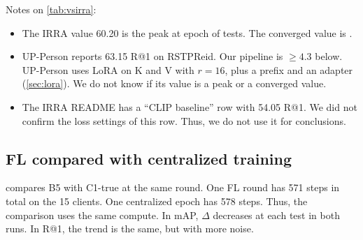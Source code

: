\begin{table}[t]
\centering\small
\caption{Comparison on the same measure. ``Peak'': maximum of all tests. ``Converged'': mean $\pm$ standard deviation of the last tests (IRRA: epochs 51--60; C1-true: epochs 15--20). $^{a}$Log in \texttt{data/irra\_rtsp} with \texttt{loss\_names: sdm+id+mlm}. Its timestamp is 2023-03-17, so it is probably the log that the IRRA authors released. We did not confirm the source. $^{b}$One seed. $^{c}$One test at round 30. The run stopped at round \numBoneLast.}\label{tab:vsirra}
\fit{}
\end{table}

Notes on \cref{tab:vsirra}:
\begin{itemize}[leftmargin=1.5em]
  \item The IRRA value 60.20 is the peak at epoch \numIrraBestEp{} of \numIrraNEval{} tests. The converged value is \numIrraConvR.
  \item UP-Person reports 63.15 R@1 on RSTPReid. Our pipeline is $\ge4.3$\pp{} below. UP-Person uses LoRA on K and V with $r=16$, plus a prefix and an adapter (\cref{sec:lora}). We do not know if its value is a peak or a converged value.
  \item The IRRA README has a ``CLIP baseline'' row with 54.05 R@1. We did not confirm the loss settings of this row. Thus, we do not use it for conclusions.
\end{itemize}

\subsection{FL compared with centralized training}\label{sec:flgap}


 compares B5 with C1-true at the same round. One FL round has 571 steps in total on the 15 clients. One centralized epoch has 578 steps. Thus, the comparison uses the same compute. In mAP, $\Delta$ decreases at each test in both runs. In R@1, the trend is the same, but with more noise.

\begin{table}[t]
\centering\small
\caption{Gap between centralized and FL training at the same round. $\Delta_i=\text{C1-true}-\text{B5 run }i$ (percentage points). $^\dagger$C1-true is flat, so the value is the converged value (mean of epochs 15--20). ``--'': run 2 stopped at round \numBtwoLast. C1-true and B5 use different learning-rate and optimizer settings. Thus, $\Delta$ is an indication, not a clean measurement.}\label{tab:flgap}
\fit{}
\end{table}

